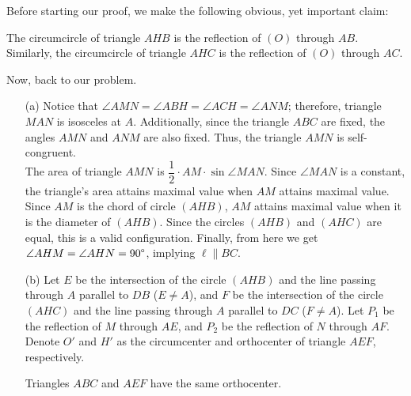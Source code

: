 \documentclass[11pt]{article}
\begin{document}
        \begin{solution}
            Before starting our proof, we make the following obvious, yet important claim:

            \begin{claim}
                The circumcircle of triangle \(AHB\) is the reflection of \((O)\) through \(AB\). Similarly, the circumcircle of triangle \(AHC\) is the reflection of \((O)\) through \(AC\).
            \end{claim}

            Now, back to our problem.

            \begin{enumerate}
                \item[(a)] Notice that \(\angle AMN = \angle ABH = \angle ACH = \angle ANM\); therefore, triangle \(MAN\) is isosceles at \(A\). Additionally, since the triangle \(ABC\) are fixed, the angles \(AMN\) and \(ANM\) are also fixed. Thus, the triangle \(AMN\) is self-congruent.\\
                The area of triangle \(AMN\) is \(\dfrac{1}{2} \cdot AM \cdot \sin \angle MAN\). Since \(\angle MAN\) is a constant, the triangle's area attains maximal value when \(AM\) attains maximal value. Since \(AM\) is the chord of circle \((AHB)\), \(AM\) attains maximal value when it is the diameter of \((AHB)\). Since the circles \((AHB)\) and \((AHC)\) are equal, this is a valid configuration. Finally, from here we get \(\angle AHM = \angle AHN = 90 \degree\), implying \(\ell \parallel BC\).

                \item[(b)] Let \(E\) be the intersection of the circle \((AHB)\) and the line passing through \(A\) parallel to \(DB\) (\(E \neq A\)), and \(F\) be the intersection of the circle \((AHC)\) and the line passing through \(A\) parallel to \(DC\) (\(F \neq A\)). Let \(P_1\) be the reflection of \(M\) through \(AE\), and \(P_2\) be the reflection of \(N\) through \(AF\). Denote \(O'\) and \(H'\) as the circumcenter and orthocenter of triangle \(AEF\), respectively.

                \begin{claim}
                    Triangles \(ABC\) and \(AEF\) have the same orthocenter.
                \end{claim}


\end{enumerate}
\end{solution}
\end{document}

